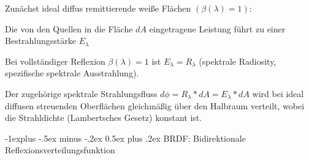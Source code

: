 \documentclass[landscape]{article}
\makeatletter
\renewcommand{\subsection}{\@startsection{subsection}{2}{0mm}%
                                {-1explus -.5ex minus -.2ex}%
                                {0.5ex plus .2ex}%
                                {\normalfont\normalsize\bfseries}}
\makeatother
\begin{document}
\begin{multicols}{3}
  Zunächst ideal diffus remittierende weiße Flächen $(\beta(\lambda) = 1)$:
  \begin{itemize*}
    \item Die von den Quellen in die Fläche $dA$ eingetragene Leistung führt zu einer Bestrahlungsstärke $E_{\lambda}$
    \item Bei vollständiger Reflexion $\beta(\lambda) = 1$ ist $E_{\lambda} = R_{\lambda}$ (spektrale Radiosity, spezifische spektrale Ausstrahlung).
    \item Der zugehörige spektrale Strahlungsfluss $d\phi = R_{\lambda} * dA = E_{\lambda} * dA$ wird bei ideal diffusen streuenden Oberflächen gleichmäßig über den Halbraum verteilt, wobei die Strahldichte (Lambertsches Gesetz) konstant ist.
  \end{itemize*}
  
  
  \subsection{ BRDF: Bidirektionale Reflexionsverteilungsfunktion}

\end{multicols}
\end{document}
